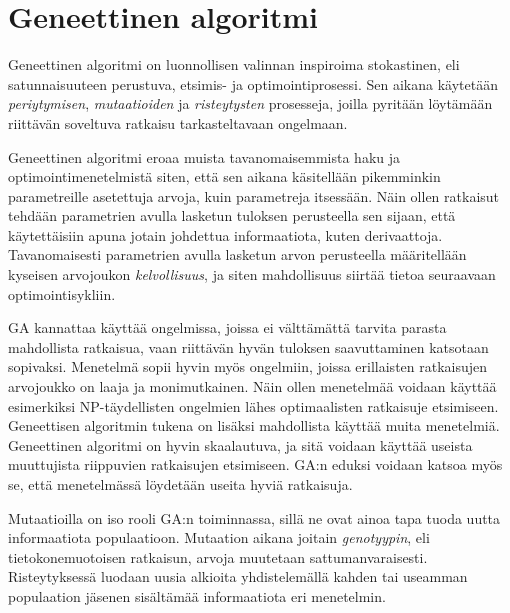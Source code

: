 \section{Geneettinen algoritmi}

Geneettinen algoritmi on luonnollisen valinnan inspiroima stokastinen,
eli satunnaisuuteen perustuva, etsimis- ja optimointiprosessi.
Sen aikana käytetään \textit{periytymisen}, \textit{mutaatioiden} ja \textit{risteytysten}
prosesseja, joilla pyritään löytämään riittävän soveltuva ratkaisu tarkasteltavaan
ongelmaan.

Geneettinen algoritmi eroaa muista tavanomaisemmista haku ja optimointimenetelmistä
siten, että sen aikana käsitellään pikemminkin parametreille asetettuja arvoja, kuin parametreja itsessään.
Näin ollen ratkaisut tehdään parametrien avulla lasketun tuloksen perusteella sen sijaan, että käytettäisiin apuna
jotain johdettua informaatiota, kuten derivaattoja. Tavanomaisesti parametrien avulla lasketun arvon
perusteella määritellään kyseisen arvojoukon \textit{kelvollisuus}, ja siten mahdollisuus siirtää tietoa seuraavaan
optimointisykliin.

GA kannattaa käyttää ongelmissa, joissa ei välttämättä tarvita parasta mahdollista ratkaisua,
vaan riittävän hyvän tuloksen saavuttaminen katsotaan sopivaksi. Menetelmä sopii hyvin myös
ongelmiin, joissa erillaisten ratkaisujen arvojoukko on laaja ja monimutkainen. Näin ollen menetelmää
voidaan käyttää esimerkiksi NP-täydellisten ongelmien lähes optimaalisten ratkaisuje etsimiseen.
Geneettisen algoritmin tukena on lisäksi mahdollista käyttää muita menetelmiä.
Geneettinen algoritmi on hyvin skaalautuva, ja sitä voidaan käyttää useista
muuttujista riippuvien ratkaisujen etsimiseen.
GA:n eduksi voidaan katsoa myös se, että menetelmässä löydetään useita hyviä ratkaisuja.

Mutaatioilla on iso rooli GA:n toiminnassa, sillä ne ovat ainoa tapa tuoda uutta informaatiota populaatioon.
Mutaation aikana joitain \textit{genotyypin}, eli tietokonemuotoisen ratkaisun, arvoja muutetaan
sattumanvaraisesti. Risteytyksessä luodaan uusia alkioita yhdistelemällä kahden tai useamman populaation
jäsenen sisältämää informaatiota eri menetelmin.



